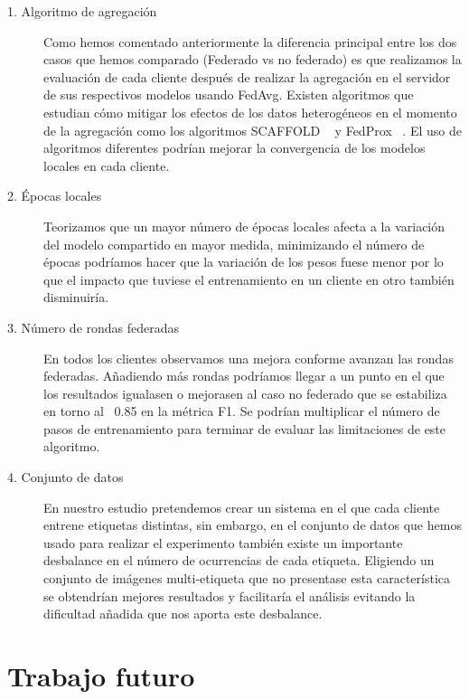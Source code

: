 \begin{description}
\item[1. Algoritmo de agregación] Como hemos comentado anteriormente la diferencia principal entre los dos casos que hemos comparado (Federado vs no federado) es que realizamos la evaluación de cada cliente después de realizar la agregación en el servidor de sus respectivos modelos usando FedAvg. Existen algoritmos que estudian cómo mitigar los efectos de los datos heterogéneos en el momento de la agregación como los algoritmos SCAFFOLD ~\cite{scaffold} y FedProx ~\cite{fedprox}. El uso de algoritmos diferentes podrían mejorar la convergencia de los modelos locales en cada cliente.

\item[2. Épocas locales] Teorizamos que un mayor número de épocas locales afecta a la variación del modelo compartido en mayor medida, minimizando el número de épocas podríamos hacer que la variación de los pesos fuese menor por lo que el impacto que tuviese el entrenamiento en un cliente en otro también disminuiría.

\item[3. Número de rondas federadas] En todos los clientes observamos una mejora conforme avanzan las rondas federadas. Añadiendo más rondas podríamos llegar a un punto en el que los resultados igualasen o mejorasen al caso no federado que se estabiliza en torno al ~0.85 en la métrica F1. Se podrían multiplicar el número de pasos de entrenamiento para terminar de evaluar las limitaciones de este algoritmo.

\item[4. Conjunto de datos] En nuestro estudio pretendemos crear un sistema en el que cada cliente entrene etiquetas distintas, sin embargo, en el conjunto de datos que hemos usado para realizar el experimento también existe un importante desbalance en el número de ocurrencias de cada etiqueta. Eligiendo un conjunto de imágenes multi-etiqueta que no presentase esta característica se obtendrían mejores resultados y facilitaría el análisis evitando la dificultad añadida que nos aporta este desbalance.

\end{description}

\section{Trabajo futuro}

